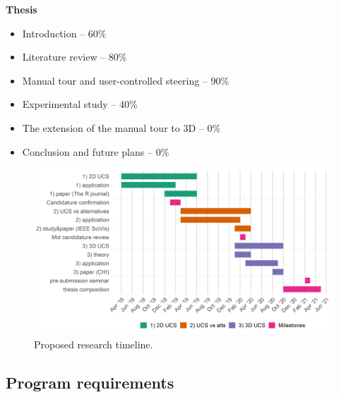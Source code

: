\documentclass[11,]{article}
\providecommand{\tightlist}{%
  \setlength{\itemsep}{0pt}\setlength{\parskip}{0pt}}
\theoremstyle{definition}
\theoremstyle{definition}
\theoremstyle{definition}
\theoremstyle{remark}
\begin{document}
\textbf{Thesis}

\begin{itemize}
\tightlist
\item
  Introduction -- 60\%
\item
  Literature review -- 80\%
\item
  Manual tour and user-controlled steering -- 90\%
\item
  Experimental study -- 40\%
\item
  The extension of the manual tour to 3D -- 0\%
\item
  Conclusion and future plans -- 0\%
\end{itemize}

\begin{figure}

{\centering \includegraphics[width=1\linewidth]{figures/phd_timeline} 

}

\caption{Proposed research timeline.}\label{fig:timeline}
\end{figure}

\subsection{Program requirements}\label{program-requirements}
\end{document}
